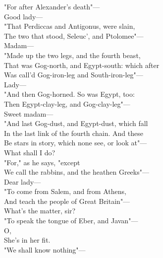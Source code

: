 \documentclass[a4paper,oneside]{memoir}
\begin{document}
\begin{drama*}
\dolspeaks "For after Alexander's death"---\\
\mammonspeaks {} Good lady---\\
\dolspeaks "That Perdiccas and Antigonus, were slain,\\
The two that stood, Seleuc', and Ptolomee"---\\
\mammonspeaks Madam---\\
\dolspeaks {} "Made up the two legs, and the fourth beast,\\
That was Gog-north, and Egypt-south: which after\\
Was call'd Gog-iron-leg and South-iron-leg"---\\
\mammonspeaks Lady---\\
\dolspeaks {} "And then Gog-horned. So was Egypt, too:\\
Then Egypt-clay-leg, and Gog-clay-leg"---\\
\mammonspeaks {} Sweet madam---\\
\dolspeaks "And last Gog-dust, and Egypt-dust, which fall\\
In the last link of the fourth chain. And these\\
Be stars in story, which none see, or look at"---\\
\mammonspeaks What shall I do?\\
\dolspeaks {} "For," as he says, "except\\
We call the rabbins, and the heathen Greeks"---\\
\mammonspeaks Dear lady---\\
\dolspeaks {} "To come from Salem, and from Athens,\\
And teach the people of Great Britain"---\\
\facespeaks {} What's the matter, sir?\\
\dolspeaks "To speak the tongue of Eber, and Javan"---\\
\mammonspeaks {} O,\\
She's in her fit.\\
\dolspeaks {} "We shall know nothing"---\\

\end{drama*}
\end{document}
